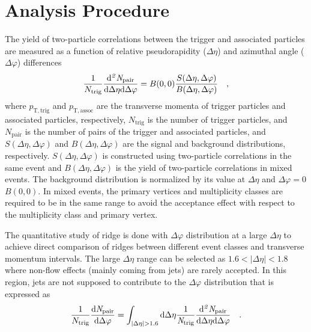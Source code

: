 \section{Analysis Procedure}
\label{sec:ana}

The yield of two-particle correlations between the trigger and associated particles are measured as a function of relative pseudorapidity ($\Delta\eta$) and azimuthal angle ($\Delta\varphi$) differences
\begin{eqnarray}
\frac{1}{N_{\rm{trig}}} \frac{ \rm{d}\it{}^{2} N_{\rm{pair}} }{ \rm{d} \Delta\eta \rm{d}\Delta\varphi} = B(0, 0)\frac{S(\Delta\eta, \Delta\varphi)}{B(\Delta\eta, \Delta\varphi)}\quad,
\end{eqnarray}
where  $p_{\mathrm{T, trig}}$ and $p_{\mathrm{T, assoc}}$ are the transverse momenta of  trigger particles and associated particles, respectively, $N_\mathrm{trig}$ is the number of trigger particles, and $N_\mathrm{pair}$ is the number of pairs of the trigger and associated particles, and $S (\Delta\eta, \Delta\varphi)$ and $B (\Delta\eta, \Delta\varphi)$ are the signal and background distributions, respectively. $S (\Delta\eta, \Delta\varphi)$ is constructed using two-particle correlations in the same event and $B(\Delta\eta, \Delta\varphi)$ is the yield of two-particle correlations in mixed events. The background distribution is normalized by its value at $\Delta\eta$ and $\Delta\varphi = 0$ $B (0,0)$. In mixed events, the primary vertices and multiplicity classes are required to be in the same range to avoid the acceptance effect with respect to the multiplicity class and primary vertex.

 The quantitative study of ridge is done with $\Delta\varphi$ distribution at a large $\Delta\eta$ to achieve direct comparison of ridges between different event classes and transverse momentum intervals. The large $\Delta\eta$ range can be selected as $1.6<|\Delta\eta|<1.8$ where non-flow effects (mainly coming from jets) are rarely accepted. In this region, jets are not supposed to contribute to the $\Delta\varphi$ distribution that is expressed as
\begin{eqnarray}
\frac{1}{N_{\rm{trig}}} \frac{ \rm{d}\it{}N_{\rm{pair}} }{ \rm{d}\Delta\varphi } = \int_{|\Delta \eta|>1.6} \rm{d} \Delta \eta \frac{1}{\it{N}_{\rm{trig}}} \frac{ \rm{d}\it{}^{2} N_{\rm{pair}} }{ \rm{d}\Delta\eta d\Delta\varphi} \quad.
\end{eqnarray}

